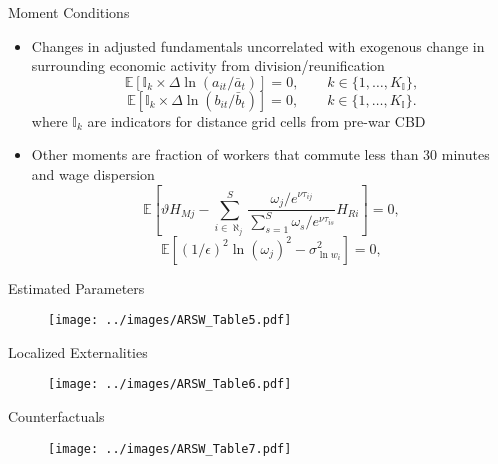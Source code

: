 \documentclass[10pt,notes=hide]{beamer}
\begin{document}
\begin{frame}{Moment Conditions}
\begin{itemize}
\item Changes in adjusted fundamentals uncorrelated with exogenous change in surrounding economic activity from division/reunification
\begin{equation*}
\mathbb{E} \left[ \mathbb{I}_{k} \times \Delta \ln \left( a_{it} / \bar{a}_{t} \right) \right] = 0, \qquad k \in \{1, \dots, K_{\mathbb{I}}\},
\end{equation*}
\begin{equation*}
\mathbb{E} \left[ \mathbb{I}_{k} \times \Delta \ln \left( b_{it} / \bar{b}_{t} \right) \right] = 0, \qquad k \in \{1, \dots, K_{\mathbb{I}}\}.
\end{equation*}
where $ \mathbb{I}_{k}$ are indicators for distance grid cells from pre-war CBD
\item Other moments are fraction of workers that commute less than 30 minutes and wage dispersion
\begin{equation*}
\mathbb{E} \left[ \vartheta H_{Mj} - \sum_{i \in \aleph_{j}}^{S} \frac{ \omega_{j} / e^{\nu \tau_{ij}} }
{\sum_{s=1}^{S} \omega_{s} / e^{\nu \tau_{is}} } H_{Ri} \right] = 0,
\end{equation*}
\begin{equation*}
\mathbb{E} \left[ \left( 1/\epsilon \right)^{2} \ln \left( \omega_{j} \right)^{2} - \sigma_{\ln w_{i}}^{2} \right] = 0,
\end{equation*}
\end{itemize}
\end{frame}
\begin{frame}{Estimated Parameters}
\begin{figure}
\centering
  \texttt{[image: ../images/ARSW\_Table5.pdf]}
\end{figure}
\end{frame}
\begin{frame}{Localized Externalities} \vspace{-0.25in}
\begin{figure}
\centering
  \texttt{[image: ../images/ARSW\_Table6.pdf]}
\end{figure}
\end{frame}
\begin{frame}{Counterfactuals}
\begin{figure}
\centering
  \texttt{[image: ../images/ARSW\_Table7.pdf]}
\end{figure}
\end{frame}
\end{document}

